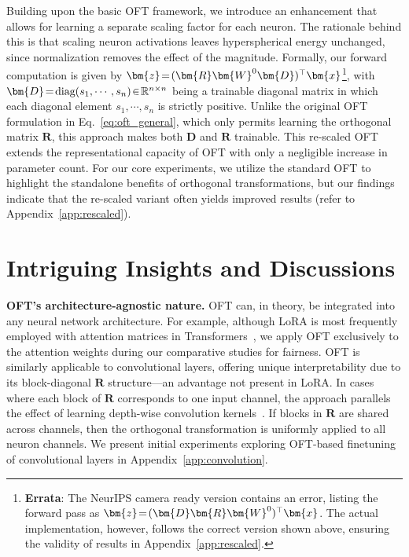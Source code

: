 Building upon the basic OFT framework, we introduce an enhancement that allows for learning a separate scaling factor for each neuron. The rationale behind this is that scaling neuron activations leaves hyperspherical energy unchanged, since normalization removes the effect of the magnitude. Formally, our forward computation is given by $\thickmuskip=2mu \medmuskip=2mu\bm{z}=(\bm{R}\bm{W}^0\bm{D})^\top\bm{x}$\footnote{\textbf{Errata}: The NeurIPS camera ready version contains an error, listing the forward pass as $\thickmuskip=2mu \medmuskip=2mu\bm{z}=(\bm{D}\bm{R}\bm{W}^0)^\top\bm{x}$. The actual implementation, however, follows the correct version shown above, ensuring the validity of results in Appendix~\ref{app:rescaled}.}, with $\thickmuskip=2mu \medmuskip=2mu \bm{D}=\text{diag}(s_1,\cdots,s_n)\in\mathbb{R}^{n\times n}$ being a trainable diagonal matrix in which each diagonal element $s_1,\cdots,s_n$ is strictly positive. Unlike the original OFT formulation in Eq.~\eqref{eq:oft_general}, which only permits learning the orthogonal matrix $\bm{R}$, this approach makes both $\bm{D}$ and $\bm{R}$ trainable. This re-scaled OFT extends the representational capacity of OFT with only a negligible increase in parameter count. For our core experiments, we utilize the standard OFT to highlight the standalone benefits of orthogonal transformations, but our findings indicate that the re-scaled variant often yields improved results (refer to Appendix~\ref{app:rescaled}).

\section{Intriguing Insights and Discussions}

\textbf{OFT’s architecture-agnostic nature.} OFT can, in theory, be integrated into any neural network architecture. For example, although LoRA is most frequently employed with attention matrices in Transformers~\cite{hulora2022}, we apply OFT exclusively to the attention weights during our comparative studies for fairness. OFT is similarly applicable to convolutional layers, offering unique interpretability due to its block-diagonal $\bm{R}$ structure—an advantage not present in LoRA. In cases where each block of $\bm{R}$ corresponds to one input channel, the approach parallels the effect of learning depth-wise convolution kernels~\cite{chollet2017xception}. If blocks in $\bm{R}$ are shared across channels, then the orthogonal transformation is uniformly applied to all neuron channels. We present initial experiments exploring OFT-based finetuning of convolutional layers in Appendix~\ref{app:convolution}.

